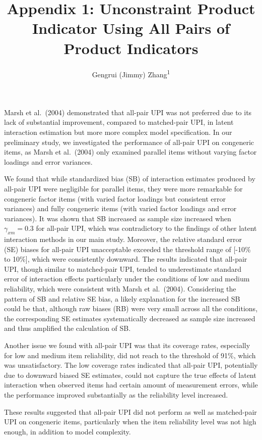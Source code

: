 \documentclass[
  man]{apa6}
\title{Appendix 1: Unconstraint Product Indicator Using All Pairs of Product Indicators}
\author{Gengrui (Jimmy) Zhang\textsuperscript{1}}
\date{}
\affiliation{\vspace{0.5cm}\textsuperscript{1} University of Southhern California}
\begin{document}
\maketitle

Marsh et al.~(2004) demonstrated that all-pair UPI was not preferred due to its lack of substantial improvement, compared to matched-pair UPI, in latent interaction estimation but more more complex model specification. In our preliminary study, we investigated the performance of all-pair UPI on congeneric items, as Marsh et al.~(2004) only examined parallel items without varying factor loadings and error variances.

We found that while standardized bias (SB) of interaction estimates produced by all-pair UPI were negligible for parallel items, they were more remarkable for congeneric factor items (with varied factor loadings but consistent error variances) and fully congeneric items (with varied factor loadings and error variances). It was shown that SB increased as sample size increased when \(\gamma_{xm} = 0.3\) for all-pair UPI, which was contradictory to the findings of other latent interaction methods in our main study. Moreover, the relative standard error (SE) biases for all-pair UPI unacceptable exceeded the threshold range of {[}-10\% to 10\%{]}, which were consistently downward. The results indicated that all-pair UPI, though similar to matched-pair UPI, tended to underestimate standard error of interaction effects particularly under the conditions of low and medium reliability, which were consistent with Marsh et al.~(2004). Considering the pattern of SB and relative SE bias, a likely explanation for the increased SB could be that, although raw biases (RB) were very small across all the conditions, the corresponding SE estimates systematically decreased as sample size increased and thus amplified the calculation of SB.

Another issue we found with all-pair UPI was that its coverage rates, especially for low and medium item reliability, did not reach to the threshold of 91\%, which was unsatisfactory. The low coverage rates indicated that all-pair UPI, potentially due to downward biased SE estimates, could not capture the true effects of latent interaction when observed items had certain amount of measurement errors, while the performance improved substantially as the reliability level increased.

These results suggested that all-pair UPI did not perform as well as matched-pair UPI on congeneric items, particularly when the item reliability level was not high enough, in addition to model complexity.
\end{document}
